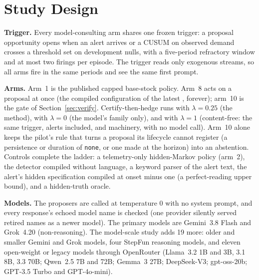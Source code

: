 \section{Study Design}
\label{sec:design}
\label{sec:triggers}
\label{sec:ladder}

\textbf{Trigger.} Every model-consulting arm shares one frozen trigger: a proposal opportunity
opens when an alert arrives or a CUSUM on observed demand~\cite{page-cusum} crosses a threshold
set on development nulls, with a five-period refractory window and at most two firings per
episode. The trigger reads only exogenous streams, so all arms fire in the same periods and see
the same first prompt.

\textbf{Arms.} Arm~1 is the published capped base-stock policy. Arm~8 acts on a proposal at once
(the compiled configuration of the latest \shockspec{}, forever); arm~10 is the gate of
Section~\ref{sec:verify}. Certify-then-hedge runs with $\lambda = 0.25$ (the method), with
$\lambda = 0$ (the model's family only), and with $\lambda = 1$ (content-free: the same trigger,
alerts included, and machinery, with no model call). Arm~10 alone keeps the pilot's rule that
turns a proposal its lifecycle cannot register (a persistence or duration of \texttt{none}, or
one made at the horizon) into an abstention. Controls complete the ladder: a telemetry-only hidden-Markov
policy (arm~2), the detector compiled without language, a keyword parser of the alert text, the
alert's hidden specification compiled at onset minus one (a perfect-reading upper bound), and a
hidden-truth oracle.

\textbf{Models.} The proposers are called at temperature 0 with no system prompt, and every
response's echoed model name is checked (one provider silently served retired names as a newer
model). The primary models are Gemini~3.8 Flash and Grok~4.20 (non-reasoning).
The model-scale study adds 19 more: older and smaller Gemini and Grok models, four StepFun
reasoning models, and eleven open-weight or legacy models through OpenRouter (Llama~3.2 1B and
3B, 3.1 8B, 3.3 70B; Qwen~2.5 7B and 72B; Gemma~3 27B; DeepSeek-V3; gpt-oss-20b; GPT-3.5 Turbo
and GPT-4o-mini).

